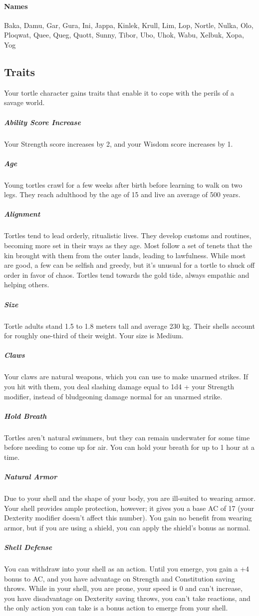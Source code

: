 \begin{linenumbers}
\paragraph{Names}
Baka, Damu, Gar, Gura, Ini, Jappa, Kinlek, Krull, Lim, Lop, Nortle, Nulka, Olo, Ploqwat, Quee, Queg, Quott, Sunny, Tibor, Ubo, Uhok, Wabu, Xelbuk, Xopa, Yog

\subsection*{Traits}
Your tortle character gains traits that enable it to cope with the perils of a savage world.
\subparagraph{Ability Score Increase} Your Strength score increases by 2, and your Wisdom score increases by 1.
\subparagraph{Age} Young tortles crawl for a few weeks after birth before learning to walk on two legs.
They reach adulthood by the age of 15 and live an average of 500 years.
\subparagraph{Alignment} Tortles tend to lead orderly, ritualistic lives.
They develop customs and routines, becoming more set in their ways as they age.
Most follow a set of tenets that the kin brought with them from the outer lands, leading to lawfulness.
While most are good, a few can be selfish and greedy, but it's unusual for a tortle to shuck off order in favor of chaos.
Tortles tend towards the gold tide, always empathic and helping others.
\subparagraph{Size} Tortle adults stand 1.5 to 1.8 meters tall and average 230 kg.
Their shells account for roughly one-third of their weight.
Your size is Medium.
\subparagraph{Claws} Your claws are natural weapons, which you can use to make unarmed strikes.
If you hit with them, you deal slashing damage equal to 1d4 + your Strength modifier, instead of bludgeoning damage normal for an unarmed strike.
\subparagraph{Hold Breath} Tortles aren't natural swimmers, but they can remain underwater for some time before needing to come up for air.
You can hold your breath for up to 1 hour at a time.
\subparagraph{Natural Armor} Due to your shell and the shape of your body, you are ill-suited to wearing armor.
Your shell provides ample protection, however; it gives you a base AC of 17 (your Dexterity modifier doesn't affect this number).
You gain no benefit from wearing armor, but if you are using a shield, you can apply the shield's bonus as normal.
\subparagraph{Shell Defense} You can withdraw into your shell as an action.
Until you emerge, you gain a +4 bonus to AC, and you have advantage on Strength and Constitution saving throws.
While in your shell, you are prone, your speed is 0 and can't increase, you have disadvantage on Dexterity saving throws, you can't take reactions, and the only action you can take is a bonus action to emerge from your shell.

\end{linenumbers}
